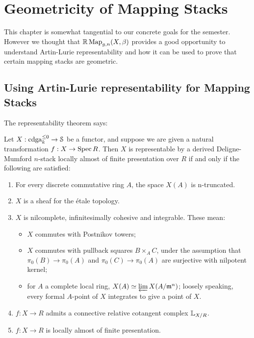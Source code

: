 \chapter{Geometricity of Mapping Stacks}
\label{ch3:geom}

This chapter is somewhat tangential to our concrete goals for the semester. However we thought that $\mathbb R\operatorname{Map}_{g,n}(X,\beta)$
provides a good opportunity to understand Artin-Lurie representability and how it can be used to prove that certain
mapping stacks are geometric.


\section{Using Artin-Lurie representability for Mapping Stacks}
The representability theorem says:

\begin{thm}
\cite{thm:lurie_representability}
Let $X: \operatorname{cdga}_k^{\leq 0}\to \mathcal S$ be a functor, and suppose we are given a natural transformation $f:X \to \operatorname{Spec} R$.
 Then $X$ is representable by a derived Deligne-Mumford $n$-stack locally almost of finite
presentation over $R$ if and only if the following are satisfied:
\begin{enumerate}
\item For every discrete commutative ring $A$, the space $X(A)$ is n-truncated.
\item $X$ is a sheaf for the \'etale topology.
\item $X$ is nilcomplete, infinitesimally cohesive and integrable. These mean:
\begin{itemize}
\item $X$ commutes with Postnikov towers;
\item $X$ commutes with pullback squares $B \times_A C$, under the assumption that $\pi_0(B) \to \pi_0(A)$ and $\pi_0(C) \to \pi_0(A)$
are surjective with nilpotent kernel;
\item for $A$ a complete local ring, $X(A) \simeq \varprojlim X(A/\mathfrak m^n)$; loosely speaking, every formal $A$-point of $X$
integrates to give a point of $X$.
\end{itemize}
\item $f:X \to R$ admits a connective relative cotangent complex $\mathbb L_{X/R}$.
\item $f:X \to R$ is locally almost of finite presentation.
\end{enumerate}
\end{thm}

